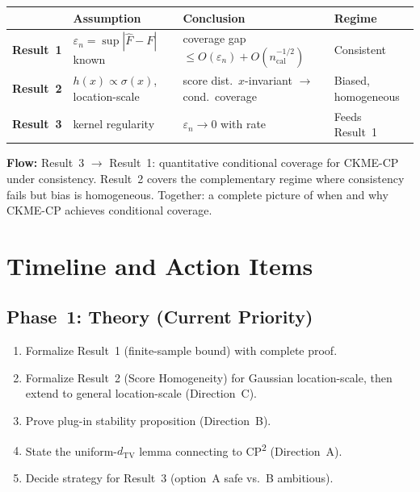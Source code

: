\documentclass[11pt]{article}
\begin{document}
\begin{center}
\begin{tabular}{@{}p{2.5cm}p{3.5cm}p{3.5cm}p{3cm}@{}}
\toprule
& \textbf{Assumption} & \textbf{Conclusion} & \textbf{Regime} \\
\midrule
\textbf{Result~1}
  & $\varepsilon_n = \sup|\hat F - F|$ known
  & coverage gap $\le O(\varepsilon_n) + O(n_{\mathrm{cal}}^{-1/2})$
  & Consistent \\
\addlinespace
\textbf{Result~2}
  & $h(x) \propto \sigma(x)$, location-scale
  & score dist.\ $x$-invariant $\to$ cond.\ coverage
  & Biased, homogeneous \\
\addlinespace
\textbf{Result~3}
  & kernel regularity
  & $\varepsilon_n \to 0$ with rate
  & Feeds Result~1 \\
\bottomrule
\end{tabular}
\end{center}

\textbf{Flow:} Result~3 $\to$ Result~1: quantitative conditional
coverage for CKME-CP under consistency. Result~2 covers the
complementary regime where consistency fails but bias is homogeneous.
Together: a complete picture of when and why CKME-CP achieves
conditional coverage.


\section{Timeline and Action Items}
\label{sec:timeline}

\subsection{Phase~1: Theory (Current Priority)}

\begin{enumerate}
  \item Formalize Result~1 (finite-sample bound) with complete proof.
  \item Formalize Result~2 (Score Homogeneity) for Gaussian
    location-scale, then extend to general location-scale (Direction~C).
  \item Prove plug-in stability proposition (Direction~B).
  \item State the uniform-$d_{\mathrm{TV}}$ lemma connecting to
    CP\textsuperscript{2} (Direction~A).
  \item Decide strategy for Result~3 (option~A safe vs.~B ambitious).
\end{enumerate}
\end{document}
